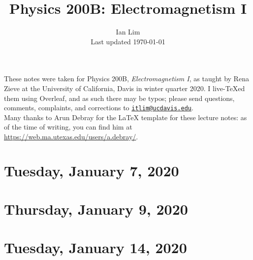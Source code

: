 \documentclass{../mynotes}
\begin{document}
\title{Physics 200B: Electromagnetism I}
\author{Ian Lim\\ Last updated \today}
\maketitle
{\small\noindent These notes were taken for Physics 200B, \emph{Electromagnetism I}, as taught by Rena Zieve at the University of California, Davis in winter quarter 2020. I live-\TeX ed them using Overleaf, and as such there may be typos; please send questions, comments, complaints, and corrections to 
\href{mailto:itlim@ucdavis.edu?subject=200B\%20Lecture\%20Notes}{\texttt{itlim@ucdavis.edu}}.\\
Many thanks to Arun Debray for the {\LaTeX} template for these lecture notes: as of the time of writing, you can find him at \url{https://web.ma.utexas.edu/users/a.debray/}.}

\tableofcontents

\section{Tuesday, January 7, 2020}
	
\section{Thursday, January 9, 2020}
    
    
\section{Tuesday, January 14, 2020}
    
\end{document}
